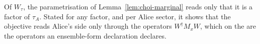 
Of $W_{\tau}$, the parametrisation of Lemma~\ref{lem:choi-marginal} reads
only that it is a factor of $\tau_A$. Stated for any factor, and per Alice
sector, it shows that the objective reads Alice's side only through the
operators $W^{\dagger}M_xW$, which on the  are the operators an
ensemble-form declaration declares.

